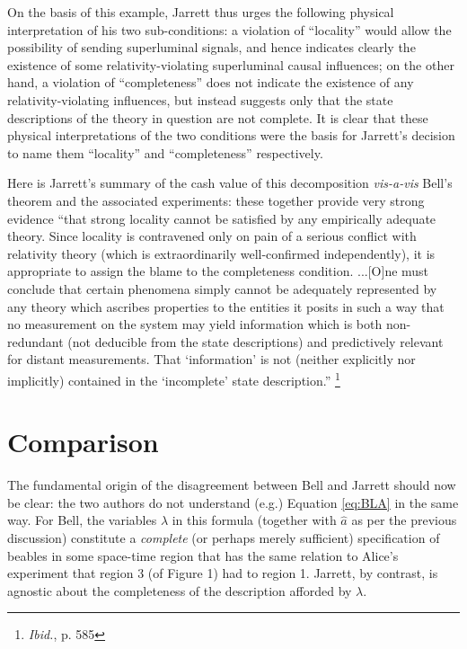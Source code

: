 \documentclass[aps,prc,twocolumn]{revtex4}
\begin{document}
On the basis of this example, 
Jarrett thus urges the following physical interpretation of
his two sub-conditions:  a violation of ``locality'' would allow the
possibility of sending superluminal signals, and hence indicates
clearly the existence of some relativity-violating superluminal causal
influences; on the other hand, a violation of ``completeness'' does
not indicate the existence of any relativity-violating influences, but
instead suggests only that the state descriptions of the theory in
question are not complete.  It is clear that these physical
interpretations of the two conditions were the basis for Jarrett's
decision to name them ``locality'' and ``completeness'' respectively.  

Here is Jarrett's summary of the cash value of this decomposition
\emph{vis-a-vis} Bell's theorem and the associated experiments:  these
together provide very strong evidence ``that
strong locality cannot be satisfied by any empirically adequate
theory.  Since locality is contravened only on pain of a serious
conflict with relativity theory (which is extraordinarily
well-confirmed independently), it is appropriate to assign the blame
to the completeness condition.  ...[O]ne must conclude that certain
phenomena simply cannot be adequately represented by any theory which
ascribes properties to the entities it posits in such a way that no
measurement on the system may yield information which is both
non-redundant (not deducible from the state descriptions) and
predictively relevant for distant measurements.  That `information' is
not (neither explicitly nor implicitly) contained in the `incomplete'
state description.''  \footnote{\emph{Ibid.}, p. 585}


\section{Comparison}

The fundamental origin of the disagreement between Bell and Jarrett
should now be clear:  the two authors do not understand (e.g.)
Equation \ref{eq:BLA} in the same way.  For Bell, the variables
$\lambda$ in this formula (together with $\hat{a}$ as per the previous 
discussion) constitute a \emph{complete} (or perhaps merely
sufficient) specification of beables in some
space-time region that has the same relation to Alice's experiment  
that region 3 (of Figure 1) had to region 1.  Jarrett, by contrast,
is agnostic about the completeness of the description afforded by
$\lambda$.  
\end{document}
